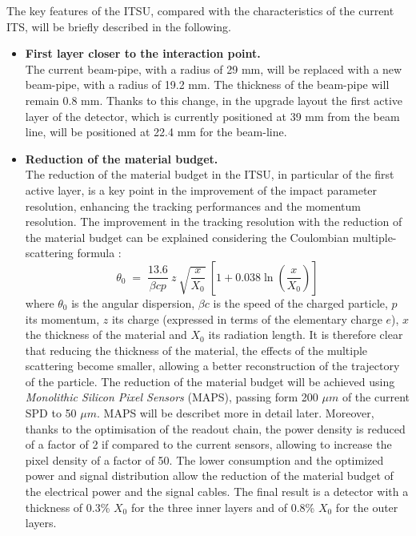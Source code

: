 \noindent
The key features of the ITSU, compared with the characteristics of the current ITS, will be briefly described in the following.
\begin{itemize}
 \item \textbf{First layer closer to the interaction point.}\\
 The current beam-pipe, with a radius of 29 mm, will be replaced with a new beam-pipe, with a radius of 19.2 mm. The thickness of the beam-pipe will remain 0.8 mm. Thanks to this change, in the upgrade layout the first active layer of the detector, which is currently positioned at 39 mm from the beam line,  will be positioned at 22.4 mm for the beam-line.
 \item \textbf{Reduction of the material budget.}\\
 The reduction of the material budget in the ITSU, in particular of the first active layer, is a key point in the improvement of the impact parameter resolution, enhancing the tracking performances and the momentum resolution. The improvement in the tracking resolution with the reduction of the material budget can be explained considering the Coulombian multiple-scattering formula \cite{pdg}:
 \begin{equation*}
  \theta_0 \; = \; \frac{13.6}{\beta c p } \: z \:  \sqrt{\frac{x}{X_0}} \: \left[1 + 0.038\ln\left(\frac{x}{X_0}\right)\right]
 \end{equation*}
 where $\theta_0$ is the angular dispersion, $\beta c$ is the speed of the charged particle, $p$ its momentum, $z$ its charge (expressed in terms of the elementary charge $e$), $x$ the thickness of the material and $X_0$ its radiation length. It is therefore clear that reducing the thickness of the material, the effects of the multiple scattering become smaller, allowing a better reconstruction of the trajectory of the particle. The reduction of the material budget will be achieved using \textit{Monolithic Silicon Pixel Sensors} (MAPS), passing form 200 $\mu m$ of the current SPD to 50 $\mu m$. MAPS will be describet more in detail later. Moreover, thanks to the optimisation of the readout chain, the power density is reduced of a factor of 2 if compared to the current sensors, allowing to increase the pixel density of a factor of 50. The lower consumption and the optimized power and signal distribution allow the reduction of the material budget of the electrical power and the signal cables. The final result is a detector with a thickness of 0.3\% $X_0$ for the three inner layers and of 0.8\%  $X_0$ for the outer layers.

\end{itemize}
